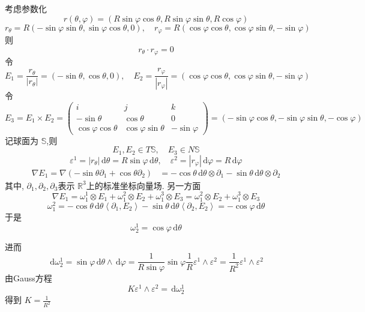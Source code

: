 \documentclass[../../main.tex]{subfiles}
\begin{document}
\begin{solution}
    考虑参数化 \[
    r\left(  \theta , \varphi  \right)= \left( R\sin  \varphi \cos  \theta ,R\sin  \varphi \sin  \theta ,R\cos  \varphi  \right)  
    \] \[
    r_{ \theta }= R\left( -\sin  \varphi \sin  \theta ,\sin  \varphi \cos  \theta ,0 \right),\quad r_{ \varphi }= R\left( \cos  \varphi \cos  \theta ,\cos  \varphi \sin  \theta ,-\sin  \varphi  \right)  
    \]则 \[
    r_{ \theta }\cdot r_{ \varphi }= 0
    \]令 \[
    E_1= \frac{r_{ \theta } }{\left| r_{ \theta } \right|  }= \left( -\sin  \theta ,\cos  \theta ,0 \right)  ,\quad E_2= \frac{r_{ \varphi } }{\left| r_{ \varphi } \right|  }= \left( \cos  \varphi \cos  \theta ,\cos  \varphi \sin  \theta ,-\sin  \varphi  \right)  
    \]令 \[
    E_3= E_1\times E_2= \begin{pmatrix} 
        i&j&k\\ 
         -\sin  \theta &\cos  \theta &0\\ 
          \cos  \varphi \cos  \theta &\cos  \varphi \sin  \theta &-\sin  \varphi   
    \end{pmatrix}= \left( -\sin  \varphi \cos  \theta  ,-\sin  \varphi \sin  \theta  , -\cos  \varphi \right)  
    \]记球面为 \(  \mathbb{S}  \),则 \[
    E_1,E_2\in T \mathbb{S},\quad E_3\in N \mathbb{S}
    \]   \[
     \varepsilon ^{1}= \left| r_{ \theta } \right|\,\mathrm{d}  \theta = R\sin  \varphi \,\mathrm{d}  \theta ,\quad  \varepsilon ^{2}= \left| r_{ \varphi } \right|\,\mathrm{d}  \varphi =R \,\mathrm{d}  \varphi   
    \]\[
  \begin{aligned}
     \nabla E_1=    \nabla \left( -\sin  \theta  \partial _{1}+ \cos  \theta  \partial _{2} \right)&=  -\cos  \theta  \,\mathrm{d}  \theta \otimes  \partial _{1}-\sin  \theta \,\mathrm{d}  \theta \otimes  \partial _{2}
  \end{aligned}
    \]其中, \(   \partial _{1}, \partial _{2}, \partial _{3}  \)表示 \(  \mathbb{R} ^{3}  \)上的标准坐标向量场.  另一方面 \[
     \nabla E_1=  \omega _{1}^{1}\otimes E_1+  \omega _{1}^{2}\otimes E_2+  \omega _{1}^{3}\otimes E_3=  \omega _{1}^{2}\otimes E_2+  \omega _{1}^{3}\otimes E_3
    \]  \[
     \omega _{1}^{2}= -\cos  \theta \,\mathrm{d}  \theta \left< \partial _{1},E_2 \right>-\sin  \theta \,\mathrm{d}  \theta \left< \partial _{2} ,E_2\right>= -\cos  \varphi \,\mathrm{d}  \theta 
    \]于是 \[
     \omega _{2}^{1}= \cos  \varphi \,\mathrm{d}  \theta 
    \]
    

    进而 \[
    \,\mathrm{d}  \omega _{2}^{1}=\sin  \varphi \,\mathrm{d}  \theta \wedge \,\mathrm{d}  \varphi = \frac{1 }{R\sin  \varphi  }\sin  \varphi  \frac{1 }{R } \varepsilon ^{1}\wedge  \varepsilon ^{2}= \frac{1 }{R^{2} }  \varepsilon ^{1}\wedge  \varepsilon ^{2} 
    \]由Gauss方程 \[
    K \varepsilon ^{1}\wedge  \varepsilon ^{2}=  \,\mathrm{d}  \omega _{2}^{1}
    \]得到 \(  K= \frac{1 }{R^{2} }   \) 
\end{solution}
\end{document}
